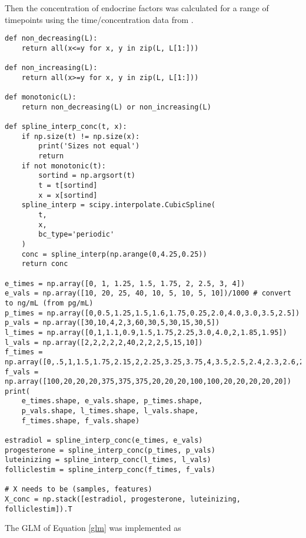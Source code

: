 \documentclass[11pt]{article}
\begin{document}
Then the concentration of endocrine factors was calculated for a range of timepoints using the time/concentration data from \cite{e2_levels}.
\begin{Verbatim}[frame=single]
def non_decreasing(L):
    return all(x<=y for x, y in zip(L, L[1:]))
    
def non_increasing(L):
    return all(x>=y for x, y in zip(L, L[1:]))
    
def monotonic(L):
    return non_decreasing(L) or non_increasing(L)

def spline_interp_conc(t, x):
    if np.size(t) != np.size(x):
        print('Sizes not equal')
        return
    if not monotonic(t):
        sortind = np.argsort(t)
        t = t[sortind]
        x = x[sortind]
    spline_interp = scipy.interpolate.CubicSpline(
        t,
        x,
        bc_type='periodic'
    )
    conc = spline_interp(np.arange(0,4.25,0.25))
    return conc

e_times = np.array([0, 1, 1.25, 1.5, 1.75, 2, 2.5, 3, 4])
e_vals = np.array([10, 20, 25, 40, 10, 5, 10, 5, 10])/1000 # convert to ng/mL (from pg/mL)
p_times = np.array([0,0.5,1.25,1.5,1.6,1.75,0.25,2.0,4.0,3.0,3.5,2.5])
p_vals = np.array([30,10,4,2,3,60,30,5,30,15,30,5])
l_times = np.array([0,1,1.1,0.9,1.5,1.75,2.25,3.0,4.0,2,1.85,1.95])
l_vals = np.array([2,2,2,2,2,40,2,2,2,5,15,10])
f_times = np.array([0,.5,1,1.5,1.75,2.15,2,2.25,3.25,3.75,4,3.5,2.5,2.4,2.3,2.6,2.7])
f_vals = np.array([100,20,20,20,375,375,375,20,20,20,100,100,20,20,20,20,20])
print(
    e_times.shape, e_vals.shape, p_times.shape,
    p_vals.shape, l_times.shape, l_vals.shape,
    f_times.shape, f_vals.shape)

estradiol = spline_interp_conc(e_times, e_vals)
progesterone = spline_interp_conc(p_times, p_vals)
luteinizing = spline_interp_conc(l_times, l_vals)
folliclestim = spline_interp_conc(f_times, f_vals)

# X needs to be (samples, features)
X_conc = np.stack([estradiol, progesterone, luteinizing, folliclestim]).T

\end{Verbatim}
The GLM of Equation \ref{glm} was implemented as
\end{document}
